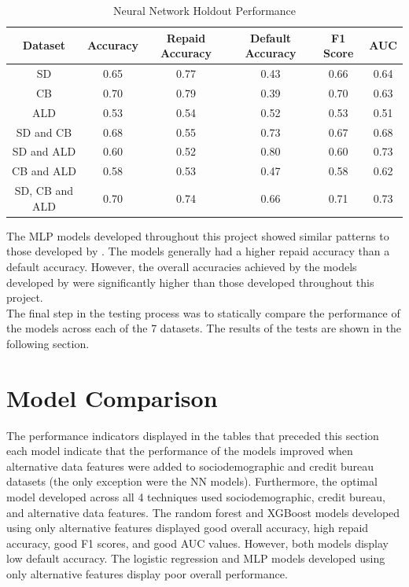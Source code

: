 \vspace{10pt}

\begin{table}[H]
\begin{center}
\begin{tabular}{|c|c|c|c|c|c|} 
\hline
\multicolumn{1}{|c|}{Dataset}
&\multicolumn{1}{|c|}{Accuracy}
&\multicolumn{1}{|c|}{Repaid Accuracy}
&\multicolumn{1}{|c|}{Default Accuracy}
&\multicolumn{1}{|c|}{F1 Score}
&\multicolumn{1}{|c|}{AUC}\\
\hline
SD & 0.65 & 0.77 & 0.43 & 0.66 & 0.64    \\
\hline
CB & 0.70 & 0.79 & 0.39 & 0.70 & 0.63    \\
\hline
ALD & 0.53 & 0.54 & 0.52 & 0.53 & 0.51    \\
\hline
SD and CB & 0.68 & 0.55 & 0.73 & 0.67 & 0.68    \\
\hline
SD and ALD & 0.60 & 0.52 & 0.80 & 0.60 & 0.73    \\
\hline
CB and ALD & 0.58 & 0.53 & 0.47 & 0.58 & 0.62    \\
\hline
SD, CB and ALD & 0.70 & 0.74 & 0.66 & 0.71 & 0.73    \\
\hline
\end{tabular}
\end{center}
\caption{Neural Network Holdout Performance}
\label{table:NN test}
\end{table}

\vspace{10pt}

The MLP models developed throughout this project showed similar patterns to those developed by \textcite{NNWest}. The models generally had a higher repaid accuracy than a default accuracy. However, the overall accuracies achieved by the models developed by \textcite{NNWest} were significantly higher than those developed throughout this project. \\

The final step in the testing process was to statically compare the performance of the models across each of the 7 datasets. The results of the tests are shown in the following section. 


\section{Model Comparison}

The performance indicators displayed in the tables that preceded this section each model indicate that the performance of the models improved when alternative data features were added to sociodemographic and credit bureau datasets (the only exception were the NN models). Furthermore, the optimal model developed across all 4 techniques used sociodemographic, credit bureau, and alternative data features. The random forest and XGBoost models developed using only alternative features displayed good overall accuracy, high repaid accuracy, good F1 scores, and good AUC values. However, both models display low default accuracy. The logistic regression and MLP models developed using only alternative features display poor overall performance. \\ 

